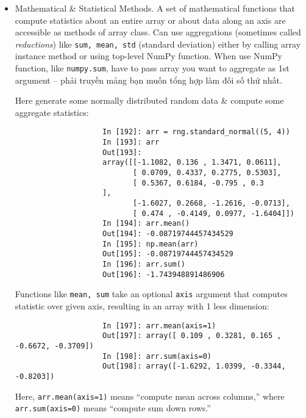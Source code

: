 \documentclass{article}
\begin{document}
\begin{enumerate}
\begin{itemize}
\begin{itemize}
\begin{itemize}
\begin{verbatim}
					       [-0.1308, 1.27 , -0.093 , -0.0662]])
					In [189]: arr > 0
					Out[189]:
					array([[ True, True, True, False],
					       [False, False, True, True],
					       [False, False, True, True],
					       [False, True, False, False]])
					In [190]: np.where(arr > 0, 2, -2)
					Out[190]:
					array([[ 2, 2, 2, -2],
					       [-2, -2, 2, 2],
					       [-2, -2, 2, 2],
					       [-2, 2, -2, -2]])
				\end{verbatim}
				Can combine scalars \& arrays when using {\tt numpy.where}. E.g., can replace all positive values in {\tt arr} with constant 2, like so:
				\begin{verbatim}
					In [191]: np.where(arr > 0, 2, arr) # set only positive values to 2
				\end{verbatim}
				\item {\sf Mathematical \& Statistical Methods.} A set of mathematical functions that compute statistics about an entire array or about data along an axis are accessible as methods of array class. Can use aggregations (sometimes called {\it reductions}) like {\tt sum, mean, std} (standard deviation) either by calling array instance method or using top-level NumPy function. When use NumPy function, like {\tt numpy.sum}, have to pass array you want to aggregate as 1st argument -- phải truyền mảng bạn muốn tổng hợp làm đối số thứ nhất.
				
				Here generate some normally distributed random data \& compute some aggregate statistics:
				\begin{verbatim}
					In [192]: arr = rng.standard_normal((5, 4))
					In [193]: arr
					Out[193]:
					array([[-1.1082, 0.136 , 1.3471, 0.0611],
					       [ 0.0709, 0.4337, 0.2775, 0.5303],
					       [ 0.5367, 0.6184, -0.795 , 0.3
					],
					       [-1.6027, 0.2668, -1.2616, -0.0713],
					       [ 0.474 , -0.4149, 0.0977, -1.6404]])
					In [194]: arr.mean()
					Out[194]: -0.08719744457434529
					In [195]: np.mean(arr)
					Out[195]: -0.08719744457434529
					In [196]: arr.sum()
					Out[196]: -1.743948891486906
				\end{verbatim}
				Functions like {\tt mean, sum} take an optional {\tt axis} argument that computes statistic over given axis, resulting in an array with 1 less dimension:
				\begin{verbatim}
					In [197]: arr.mean(axis=1)
					Out[197]: array([ 0.109 , 0.3281, 0.165 , -0.6672, -0.3709])
					In [198]: arr.sum(axis=0)
					Out[198]: array([-1.6292, 1.0399, -0.3344, -0.8203])
				\end{verbatim}
				Here, {\tt arr.mean(axis=1)} means ``compute mean across columns,'' where {\tt arr.sum(axis=0)} means ``compute sum down rows.''
				

\end{itemize}
\end{itemize}
\end{itemize}
\end{enumerate}
\end{document}
